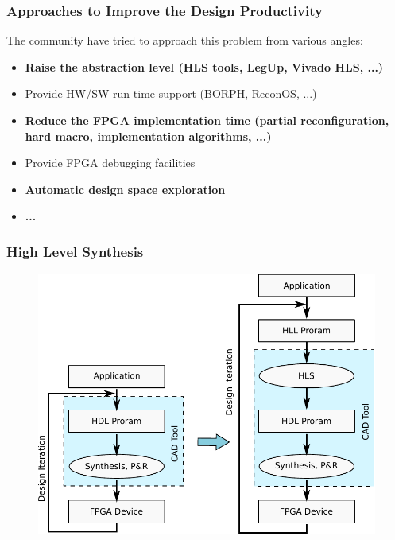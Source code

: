 \documentclass[accentcolor=tud1a,colorbacktitle,inverttitle,landscape,german,presentation,t]{tudbeamer}
\begin{document}
   \begin{frame}
   \frametitle{Approaches to Improve the Design Productivity}
   The community have tried to approach this problem from various angles:
   \vspace{0.6em}
   \begin{itemize}
   \item \textbf{Raise the abstraction level (HLS tools, LegUp, Vivado HLS, ...)}
   \item Provide HW/SW run-time support (BORPH, ReconOS, ...)
   \item \textbf{Reduce the FPGA implementation time (partial reconfiguration, hard macro, implementation algorithms, ...)}
   \item Provide FPGA debugging facilities
   \item \textbf{Automatic design space exploration}
   \item \textbf{...}
   \end{itemize}

   \vspace{2em}
   {}
   \end{frame}

   \begin{frame}
   \frametitle{High Level Synthesis}
   \vspace{-0.9em}
   \begin{figure}
      \includegraphics[width=.6\linewidth]{hls-compilation}
   \end{figure}
   \end{frame}
\end{document}
